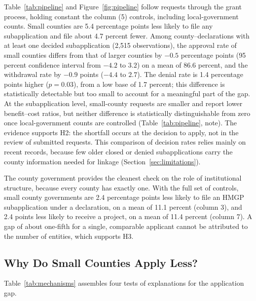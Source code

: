 Table~\ref{tab:pipeline} and Figure~\ref{fig:pipeline} follow requests through the grant process, holding constant the column (5) controls, including local-government counts. Small counties are 5.4 percentage points less likely to file any subapplication and file about 4.7 percent fewer. Among county--declarations with at least one decided subapplication (2,515 observations), the approval rate of small counties differs from that of larger counties by $-0.5$ percentage points (95 percent confidence interval from $-4.2$ to $3.2$) on a mean of 86.6 percent, and the withdrawal rate by $-0.9$ points ($-4.4$ to $2.7$). The denial rate is 1.4 percentage points higher ($p = 0.03$), from a low base of 1.7 percent; this difference is statistically detectable but too small to account for a meaningful part of the gap. At the subapplication level, small-county requests are smaller and report lower benefit--cost ratios, but neither difference is statistically distinguishable from zero once local-government counts are controlled (Table~\ref{tab:pipeline}, note). The evidence supports H2: the shortfall occurs at the decision to apply, not in the review of submitted requests. This comparison of decision rates relies mainly on recent records, because few older closed or denied subapplications carry the county information needed for linkage (Section~\ref{sec:limitations}).

The county government provides the cleanest check on the role of institutional structure, because every county has exactly one. With the full set of controls, small county governments are 2.4 percentage points less likely to file an HMGP subapplication under a declaration, on a mean of 11.1 percent (column 3), and 2.4 points less likely to receive a project, on a mean of 11.4 percent (column 7). A gap of about one-fifth for a single, comparable applicant cannot be attributed to the number of entities, which supports H3.

\subsection{Why Do Small Counties Apply Less?}
\label{sec:explanations}

Table~\ref{tab:mechanisms} assembles four tests of explanations for the application gap.

